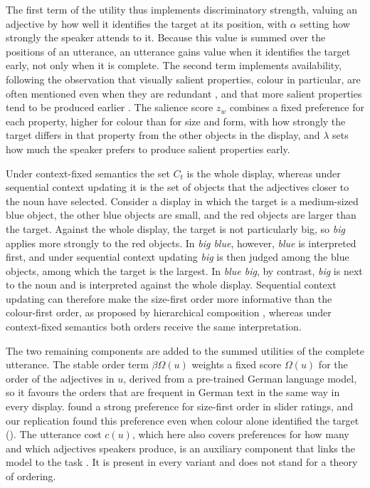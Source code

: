 \documentclass[10pt,a4paper,fleqn]{article}
\begin{document}
The first term of the utility thus implements discriminatory strength, valuing an adjective by how well it identifies the target at its position, with $\alpha$ setting how strongly the speaker attends to it.
Because this value is summed over the positions of an utterance, an utterance gains value when it identifies the target early, not only when it is complete.
The second term implements availability, following the observation that visually salient properties, colour in particular, are often mentioned even when they are redundant \citep[p.~2]{rubio2016redundant}, and that more salient properties tend to be produced earlier \citep[p.~47]{fukumura2018ordering}.
The salience score $z_w$ combines a fixed preference for each property, higher for colour than for size and form, with how strongly the target differs in that property from the other objects in the display, and $\lambda$ sets how much the speaker prefers to produce salient properties early.

Under context-fixed semantics the set $C_t$ is the whole display, whereas under sequential context updating it is the set of objects that the adjectives closer to the noun have selected.
Consider a display in which the target is a medium-sized blue object, the other blue objects are small, and the red objects are larger than the target.
Against the whole display, the target is not particularly big, so \emph{big} applies more strongly to the red objects.
In \emph{big blue}, however, \emph{blue} is interpreted first, and under sequential context updating \emph{big} is then judged among the blue objects, among which the target is the largest.
In \emph{blue big}, by contrast, \emph{big} is next to the noun and is interpreted against the whole display.
Sequential context updating can therefore make the size-first order more informative than the colour-first order, as proposed by hierarchical composition \citep{scontras2019grammatical,franke2019subjectivity}, whereas under context-fixed semantics both orders receive the same interpretation.

The two remaining components are added to the summed utilities of the complete utterance.
The stable order term $\beta\Omega(u)$ weights a fixed score $\Omega(u)$ for the order of the adjectives in $u$, derived from a pre-trained German language model, so it favours the orders that are frequent in German text in the same way in every display.
\citet[p.~124]{schlotterbeck2023incremental} found a strong preference for size-first order in slider ratings, and our replication found this preference even when colour alone identified the target ().
The utterance cost $c(u)$, which here also covers preferences for how many and which adjectives speakers produce, is an auxiliary component that links the model to the task \citep{lee2013bayesian,franke2016task}.
It is present in every variant and does not stand for a theory of ordering.
\end{document}
